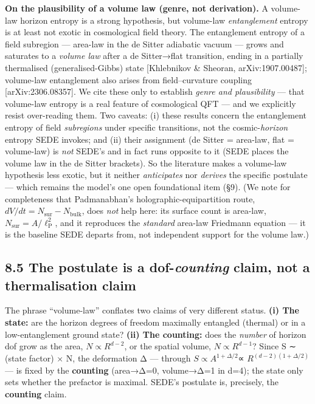 \documentclass[
  10pt,
]{article}
\begin{document}
\textbf{On the plausibility of a volume law (genre, not derivation).} A
volume-law horizon entropy is a strong hypothesis, but volume-law
\emph{entanglement} entropy is at least not exotic in cosmological field
theory. The entanglement entropy of a field subregion --- area-law in
the de Sitter adiabatic vacuum --- grows and saturates to a \emph{volume
law} after a de Sitter→flat transition, ending in a partially
thermalised (generalised-Gibbs) state {[}Khlebnikov \& Sheoran,
arXiv:1907.00487{]}; volume-law entanglement also arises from
field--curvature coupling {[}arXiv:2306.08357{]}. We cite these only to
establish \emph{genre and plausibility} --- that volume-law entropy is a
real feature of cosmological QFT --- and we explicitly resist
over-reading them. Two caveats: (i) these results concern the
entanglement entropy of field \emph{subregions} under specific
transitions, not the cosmic-\emph{horizon} entropy SEDE invokes; and
(ii) their assignment (de Sitter = area-law, flat = volume-law) is
\emph{not} SEDE's and in fact runs opposite to it (SEDE places the
volume law in the de Sitter brackets). So the literature makes a
volume-law hypothesis less exotic, but it neither \emph{anticipates} nor
\emph{derives} the specific postulate --- which remains the model's one
open foundational item (§9). (We note for completeness that
Padmanabhan's holographic-equipartition route,
\(dV/dt = N_{\mathrm{sur}} - N_{\mathrm{bulk}}\), does \emph{not} help
here: its surface count is area-law,
\(N_{\mathrm{sur}} = A/\ell _{\mathrm{P}}^{2}\), and it reproduces the
\emph{standard} area-law Friedmann equation --- it is the baseline SEDE
departs from, not independent support for the volume law.)

\subsection{\texorpdfstring{8.5 The postulate is a dof-\emph{counting}
claim, not a thermalisation
claim}{8.5 The postulate is a dof-counting claim, not a thermalisation claim}}\label{the-postulate-is-a-dof-counting-claim-not-a-thermalisation-claim}

The phrase ``volume-law'' conflates two claims of very different status.
\textbf{(i) The state:} are the horizon degrees of freedom maximally
entangled (thermal) or in a low-entanglement ground state? \textbf{(ii)
The counting:} does the \emph{number} of horizon dof grow as the area,
\(N \propto  R^{d-2}\), or the spatial volume, \(N \propto  R^{d-1}\)?
Since S ∼ (state factor) × N, the deformation Δ --- through
\(S \propto  A^{1+\Delta /2}\)∝ \(R^{(d-2)(1+\Delta /2)}\) --- is fixed
by the \textbf{counting} (area→Δ=0, volume→Δ=1 in d=4); the state only
sets whether the prefactor is maximal. SEDE's postulate is, precisely,
the \textbf{counting} claim.
\end{document}
